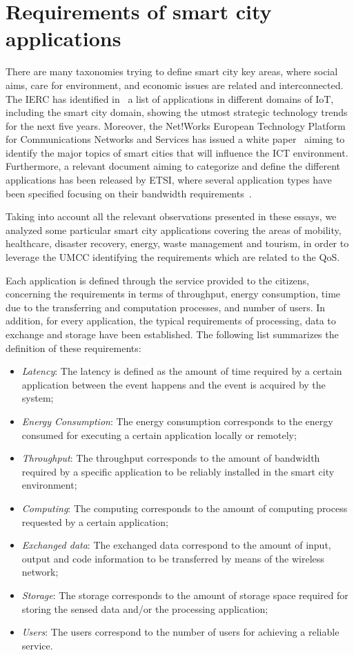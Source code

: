 \documentclass[twoside,openright]{report}
\begin{document}
\section{Requirements of smart city applications}
\label{sec:requirements}
There are many taxonomies trying to define smart city key areas, where social aims, care for environment, and economic issues are related and interconnected. 
The \gls{IERC} has identified in~\cite{IERC} a list of applications in different domains of \gls{IoT}, including the smart city domain, showing the utmost strategic technology trends for the next five years. 
Moreover, the Net!Works European Technology Platform for Communications Networks and Services has issued a white paper~\cite{whitepaperNetWorks} aiming to identify the major topics of smart cities that will influence the \gls{ICT} environment. 
Furthermore, a relevant document aiming to categorize and define the different applications has been released by \gls{ETSI}, where several application types have been specified focusing on their bandwidth requirements~\cite{etsi}. 

Taking into account all the relevant observations presented in these essays, we analyzed some particular smart city applications covering the areas of mobility, healthcare, disaster recovery, energy, waste management and tourism, in order to leverage the \gls{UMCC} identifying the requirements which are related to the \gls{QoS}.

Each application is defined through the service provided to the citizens, concerning the requirements in terms of throughput, energy consumption, time due to the transferring and computation processes, and number of users. 
In addition, for every application, the typical requirements of processing, data to exchange and storage have been established. The following list summarizes the definition of these requirements:
\begin{itemize}
	\item \emph{Latency}: The latency is defined as the amount of time required by a certain application between the event happens and the event is acquired by the system;
	\item \emph{Energy Consumption}: The energy consumption corresponds to the energy consumed for executing a certain application locally or remotely;
	\item \emph{Throughput}: The throughput corresponds to the amount of bandwidth required by a specific application to be reliably installed in the smart city environment;
	\item \emph{Computing}: The computing corresponds to the amount of computing process requested by a certain application;
	\item \emph{Exchanged data}: The exchanged data correspond to the amount of input, output and code information to be transferred by means of the wireless network; 
	\item \emph{Storage}: The storage corresponds to the amount of storage space required for storing the sensed data and/or the processing application;
	\item \emph{Users}: The users correspond to the number of users for achieving a reliable service.
\end{itemize}
\end{document}
